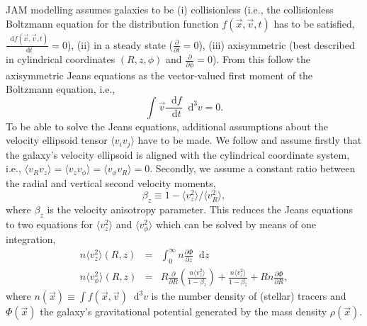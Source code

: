 \documentclass[useAMS,usenatbib]{mnras}
\newcommand*\diff{\mathop{}\!\mathrm{d}}
\newcommand*\Diff[1]{\mathop{}\!\mathrm{d^#1}}
\newcommand{\vect}[1]{\vec{#1}} %
\begin{document}
JAM modelling assumes galaxies to be (i) collisionless (i.e., the collisionless Boltzmann equation for the distribution function $f(\vect{x},\vect{v},t)$ has to be satisfied, $\frac{\diff f(\vect{x},\vect{v},t)}{\diff t} = 0$), (ii) in a steady state ($\frac{\partial}{\partial t} = 0$), (iii) axisymmetric (best described in cylindrical coordinates $(R,z,\phi)$ and $\frac{\partial}{\partial \phi} = 0$). From this follow the axisymmetric Jeans equations as the vector-valued first moment of the Boltzmann equation, i.e.,
\begin{equation*}
\int \vect{v} \frac{\diff f}{\diff t} \Diff3 v = 0.
\end{equation*}
To be able to solve the Jeans equations, additional assumptions about the velocity ellipsoid tensor $\langle v_i v_j\rangle$ have to be made. We follow \citet{Cap08} and assume firstly that the galaxy's velocity ellipsoid is aligned with the cylindrical coordinate system, i.e., $\langle v_R v_z\rangle = \langle v_z v_\phi \rangle = \langle v_\phi v_R \rangle = 0$. Secondly, we assume a constant ratio between the radial and vertical second velocity moments, 
\begin{equation}
\beta_z \equiv 1 - \langle v_z^2 \rangle / \langle v_R^2\rangle, \label{eq:bz}
\end{equation}
where $\beta_z$ is the velocity anisotropy parameter. This reduces the Jeans equations to two equations for $\langle v_z^2 \rangle$ and $\langle v_\phi^2 \rangle$ which can be solved by means of one integration,
\begin{eqnarray}
n \langle v_z^2 \rangle (R,z) &=& \int_0^\infty n \frac{\partial \Phi}{\partial z} \diff z \label{eq:Jeans1}\\
n \langle v_\phi^2 \rangle (R,z) &=& R \frac{\partial}{\partial R} \left( \frac{n \langle v_z^2 \rangle}{1-\beta_z} \right) + \frac{n \langle v_z^2 \rangle}{1 - \beta_z} + R n \frac{\partial \Phi}{\partial R},\label{eq:Jeans2}
\end{eqnarray}
where $n(\vect{x}) \equiv \int f(\vect{x},\vect{v}) \Diff3 v$ is the number density of (stellar) tracers and $\Phi(\vect{x})$ the galaxy's gravitational potential generated by the mass density $\rho(\vect{x})$.
\end{document}
